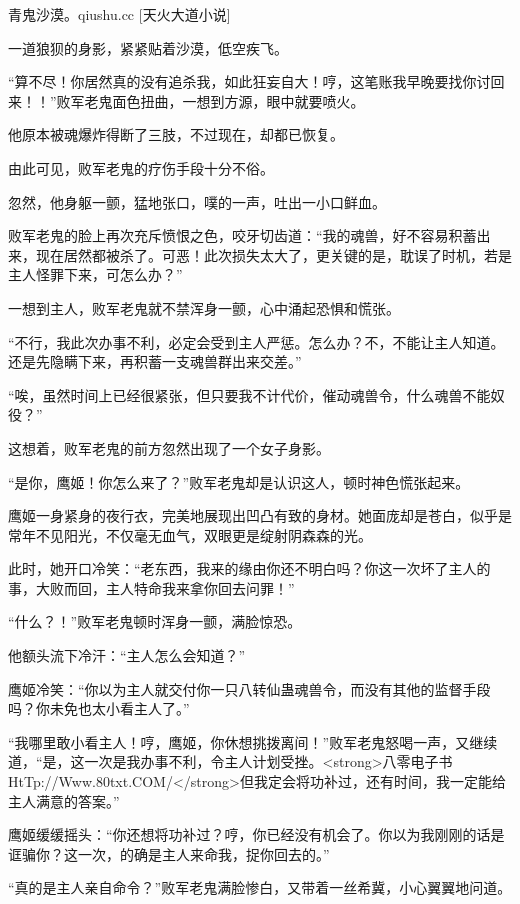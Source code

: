 
\begin{this_body}

青鬼沙漠。qiushu.cc [天火大道小说]

一道狼狈的身影，紧紧贴着沙漠，低空疾飞。

“算不尽！你居然真的没有追杀我，如此狂妄自大！哼，这笔账我早晚要找你讨回来！！”败军老鬼面色扭曲，一想到方源，眼中就要喷火。

他原本被魂爆炸得断了三肢，不过现在，却都已恢复。

由此可见，败军老鬼的疗伤手段十分不俗。

忽然，他身躯一颤，猛地张口，噗的一声，吐出一小口鲜血。

败军老鬼的脸上再次充斥愤恨之色，咬牙切齿道：“我的魂兽，好不容易积蓄出来，现在居然都被杀了。可恶！此次损失太大了，更关键的是，耽误了时机，若是主人怪罪下来，可怎么办？”

一想到主人，败军老鬼就不禁浑身一颤，心中涌起恐惧和慌张。

“不行，我此次办事不利，必定会受到主人严惩。怎么办？不，不能让主人知道。还是先隐瞒下来，再积蓄一支魂兽群出来交差。”

“唉，虽然时间上已经很紧张，但只要我不计代价，催动魂兽令，什么魂兽不能奴役？”

这想着，败军老鬼的前方忽然出现了一个女子身影。

“是你，鹰姬！你怎么来了？”败军老鬼却是认识这人，顿时神色慌张起来。

鹰姬一身紧身的夜行衣，完美地展现出凹凸有致的身材。她面庞却是苍白，似乎是常年不见阳光，不仅毫无血气，双眼更是绽射阴森森的光。

此时，她开口冷笑：“老东西，我来的缘由你还不明白吗？你这一次坏了主人的事，大败而回，主人特命我来拿你回去问罪！”

“什么？！”败军老鬼顿时浑身一颤，满脸惊恐。

他额头流下冷汗：“主人怎么会知道？”

鹰姬冷笑：“你以为主人就交付你一只八转仙蛊魂兽令，而没有其他的监督手段吗？你未免也太小看主人了。”

“我哪里敢小看主人！哼，鹰姬，你休想挑拨离间！”败军老鬼怒喝一声，又继续道，“是，这一次是我办事不利，令主人计划受挫。<strong>八零电子书HtTp://Www.80txt.COM/</strong>但我定会将功补过，还有时间，我一定能给主人满意的答案。”

鹰姬缓缓摇头：“你还想将功补过？哼，你已经没有机会了。你以为我刚刚的话是诓骗你？这一次，的确是主人来命我，捉你回去的。”

“真的是主人亲自命令？”败军老鬼满脸惨白，又带着一丝希冀，小心翼翼地问道。


\end{this_body}
